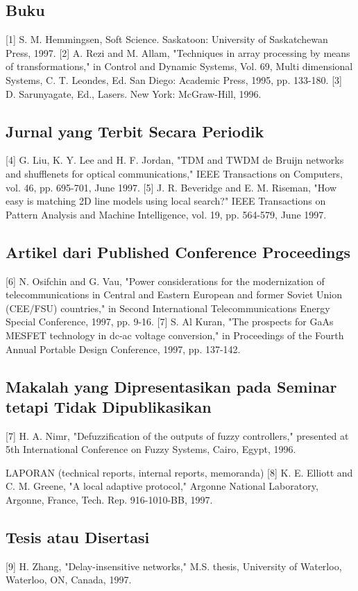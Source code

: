 \subsection{Buku}
[1] S. M. Hemmingsen, Soft Science. Saskatoon: University of Saskatchewan Press, 1997.
[2] A. Rezi and M. Allam, "Techniques in array processing by means of transformations," in Control and Dynamic Systems, Vol. 69, Multi dimensional Systems, C. T. Leondes, Ed. San Diego: Academic Press, 1995, pp. 133-180. 
[3] D. Sarunyagate, Ed., Lasers. New York: McGraw-Hill, 1996.

\subsection{Jurnal yang Terbit Secara Periodik}
[4] G. Liu, K. Y. Lee and H. F. Jordan, "TDM and TWDM de Bruijn networks and shufflenets for optical communications," IEEE Transactions on Computers, vol. 46, pp. 695-701, June 1997.
[5] J. R. Beveridge and E. M. Riseman, "How easy is matching 2D line models using local search?" IEEE Transactions on Pattern Analysis and Machine Intelligence, vol. 19, pp. 564-579, June 1997.

\subsection{Artikel dari Published Conference Proceedings}
[6] N. Osifchin and G. Vau, "Power considerations for the modernization of telecommunications in Central and Eastern European and former Soviet Union (CEE/FSU) countries," in Second International Telecommunications Energy Special Conference, 1997, pp. 9-16.
[7] S. Al Kuran, "The prospects for GaAs MESFET technology in dc-ac voltage conversion," in Proceedings of the Fourth Annual Portable Design Conference, 1997, pp. 137-142.

\subsection{Makalah yang Dipresentasikan pada Seminar tetapi Tidak Dipublikasikan}
[7] H. A. Nimr, "Defuzzification of the outputs of fuzzy controllers," presented at 5th International Conference on Fuzzy Systems, Cairo, Egypt, 1996.

LAPORAN (technical reports, internal reports, memoranda) 
[8] K. E. Elliott and C. M. Greene, "A local adaptive protocol," Argonne National Laboratory, Argonne, France, Tech. Rep. 916-1010-BB, 1997.

\subsection{Tesis atau Disertasi}
[9] H. Zhang, "Delay-insensitive networks," M.S. thesis, University of Waterloo, Waterloo, ON, Canada, 1997.



